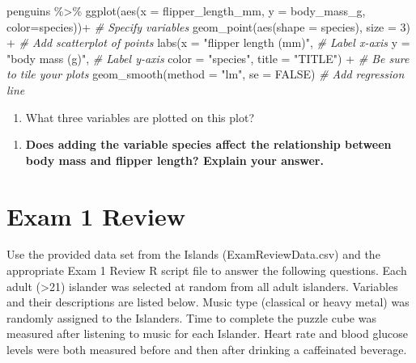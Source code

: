 \documentclass[
]{report}
\newenvironment{Shaded}{\begin{snugshade}}{\end{snugshade}}
\newcommand{\AttributeTok}[1]{\textcolor[rgb]{0.77,0.63,0.00}{#1}}
\newcommand{\CommentTok}[1]{\textcolor[rgb]{0.56,0.35,0.01}{\textit{#1}}}
\newcommand{\ConstantTok}[1]{\textcolor[rgb]{0.00,0.00,0.00}{#1}}
\newcommand{\DecValTok}[1]{\textcolor[rgb]{0.00,0.00,0.81}{#1}}
\newcommand{\FunctionTok}[1]{\textcolor[rgb]{0.00,0.00,0.00}{#1}}
\newcommand{\NormalTok}[1]{#1}
\newcommand{\SpecialCharTok}[1]{\textcolor[rgb]{0.00,0.00,0.00}{#1}}
\newcommand{\StringTok}[1]{\textcolor[rgb]{0.31,0.60,0.02}{#1}}
\providecommand{\tightlist}{%
  \setlength{\itemsep}{0pt}\setlength{\parskip}{0pt}}
\begin{document}
\begin{Shaded}
\begin{Highlighting}[]
\NormalTok{penguins }\SpecialCharTok{\%\textgreater{}\%}
  \FunctionTok{ggplot}\NormalTok{(}\FunctionTok{aes}\NormalTok{(}\AttributeTok{x =}\NormalTok{ flipper\_length\_mm, }\AttributeTok{y =}\NormalTok{ body\_mass\_g, }\AttributeTok{color=}\NormalTok{species))}\SpecialCharTok{+}  \CommentTok{\# Specify variables}
  \FunctionTok{geom\_point}\NormalTok{(}\FunctionTok{aes}\NormalTok{(}\AttributeTok{shape =}\NormalTok{ species), }\AttributeTok{size =} \DecValTok{3}\NormalTok{) }\SpecialCharTok{+}  \CommentTok{\# Add scatterplot of points}
  \FunctionTok{labs}\NormalTok{(}\AttributeTok{x =} \StringTok{"flipper length (mm)"}\NormalTok{,  }\CommentTok{\# Label x{-}axis}
       \AttributeTok{y =} \StringTok{"body mass (g)"}\NormalTok{,  }\CommentTok{\# Label y{-}axis}
       \AttributeTok{color =} \StringTok{"species"}\NormalTok{,}
       \AttributeTok{title =} \StringTok{"TITLE"}\NormalTok{) }\SpecialCharTok{+} \CommentTok{\# Be sure to tile your plots}
  \FunctionTok{geom\_smooth}\NormalTok{(}\AttributeTok{method =} \StringTok{"lm"}\NormalTok{, }\AttributeTok{se =} \ConstantTok{FALSE}\NormalTok{)  }\CommentTok{\# Add regression line}
\end{Highlighting}
\end{Shaded}

\begin{enumerate}
\def\labelenumi{\arabic{enumi}.}
\setcounter{enumi}{9}
\tightlist
\item
  What three variables are plotted on this plot?
\end{enumerate}

\vspace{0.3in}

\begin{enumerate}
\def\labelenumi{\arabic{enumi}.}
\setcounter{enumi}{10}
\tightlist
\item
  \textbf{Does adding the variable species affect the relationship between body mass and flipper length? Explain your answer.}
\end{enumerate}

\newpage

\hypertarget{exam-1-review}{%
\chapter{Exam 1 Review}\label{exam-1-review}}

Use the provided data set from the Islands (ExamReviewData.csv) and the appropriate Exam 1 Review R script file to answer the following questions. Each adult (\textgreater21) islander was selected at random from all adult islanders. Variables and their descriptions are listed below. Music type (classical or heavy metal) was randomly assigned to the Islanders. Time to complete the puzzle cube was measured after listening to music for each Islander. Heart rate and blood glucose levels were both measured before and then after drinking a caffeinated beverage.
\end{document}
